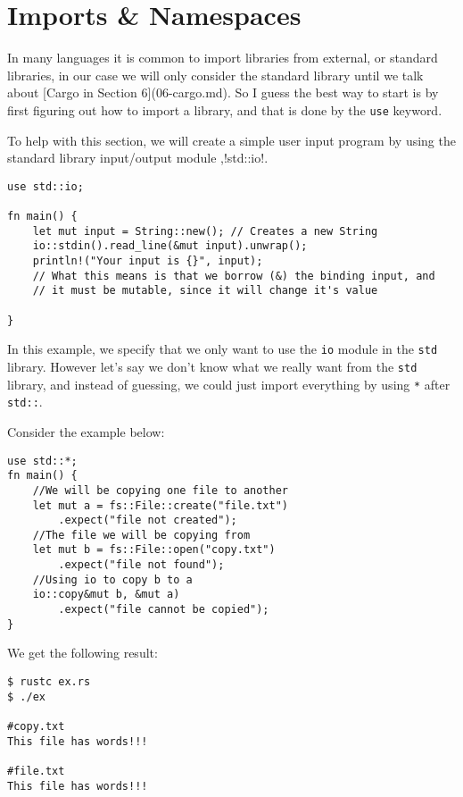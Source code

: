 \chapter{Imports \& Namespaces}
\par In many languages it is common to import libraries from external, or standard libraries, in our case we will only consider the standard library until we talk about [Cargo in Section 6](06-cargo.md). So I guess the best way to start is by first figuring out how to import a library, and that is done by the \verb!use! keyword. 

\par To help with this section, we will create a simple user input program by using the standard library input/output module ,!std::io!. 

\begin{lstlisting}
use std::io;

fn main() {
    let mut input = String::new(); // Creates a new String
    io::stdin().read_line(&mut input).unwrap();
    println!("Your input is {}", input);
    // What this means is that we borrow (&) the binding input, and
    // it must be mutable, since it will change it's value
    
}    
\end{lstlisting}

\par In this example, we specify that we only want to use the \verb!io! module in the 
 \verb!std! library. However let's say we don't know what we really want from the \verb!std! 
library, and instead of guessing, we could just import everything by using \verb!*! after 
 \verb!std::!. 

\par Consider the example below: 
\begin{lstlisting}
use std::*;
fn main() {
    //We will be copying one file to another
    let mut a = fs::File::create("file.txt")
        .expect("file not created");
    //The file we will be copying from
    let mut b = fs::File::open("copy.txt")
        .expect("file not found");
    //Using io to copy b to a
    io::copy&mut b, &mut a)
        .expect("file cannot be copied");
}    
\end{lstlisting}
\par We get the following result:
\lstset{language=sh}
\begin{lstlisting}
$ rustc ex.rs
$ ./ex

#copy.txt
This file has words!!!

#file.txt
This file has words!!!    
\end{lstlisting}


